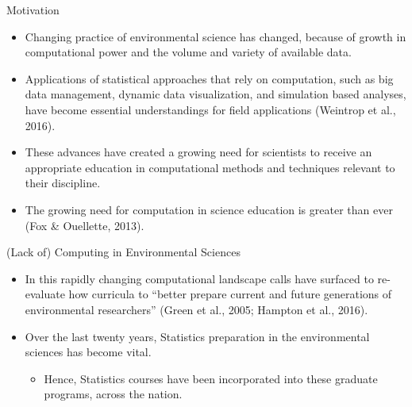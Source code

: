 \documentclass[10pt,ignorenonframetext,]{beamer}
\providecommand{\tightlist}{%
  \setlength{\itemsep}{0pt}\setlength{\parskip}{0pt}}
\begin{document}
\begin{frame}{Motivation}

\begin{itemize}[<+->]
\item
  Changing practice of environmental science has changed, because of
  growth in computational power and the volume and variety of available
  data.
\item
  Applications of statistical approaches that rely on computation, such
  as big data management, dynamic data visualization, and simulation
  based analyses, have become essential understandings for field
  applications (Weintrop et al., 2016).
\item
  These advances have created a growing need for scientists to receive
  an appropriate education in computational methods and techniques
  relevant to their discipline.
\item
  The growing need for computation in science education is greater than
  ever (Fox \& Ouellette, 2013).
\end{itemize}

\end{frame}

\begin{frame}{(Lack of) Computing in Environmental Sciences}

\begin{itemize}[<+->]
\item
  In this rapidly changing computational landscape calls have surfaced
  to re-evaluate how curricula to ``better prepare current and future
  generations of environmental researchers'' (Green et al., 2005;
  Hampton et al., 2016).
\item
  Over the last twenty years, Statistics preparation in the
  environmental sciences has become vital.

  \begin{itemize}[<+->]
  \tightlist
  \item
    Hence, Statistics courses have been incorporated into these graduate
    programs, across the nation.
  \end{itemize}
\end{itemize}

\end{frame}
\end{document}
